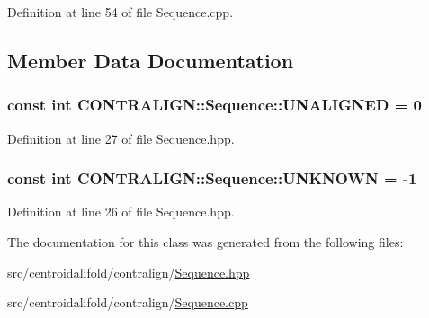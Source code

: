Definition at line 54 of file Sequence.\+cpp.



\subsection{Member Data Documentation}
\hypertarget{class_c_o_n_t_r_a_l_i_g_n_1_1_sequence_a774a2f48e7469edbb81641e5abf26ccd}{
\subsubsection[{U\+N\+A\+L\+I\+G\+N\+E\+D}]{\setlength{\rightskip}{0pt plus 5cm}const int C\+O\+N\+T\+R\+A\+L\+I\+G\+N\+::\+Sequence\+::\+U\+N\+A\+L\+I\+G\+N\+E\+D = 0\hspace{0.3cm}{\ttfamily [static]}}}\label{class_c_o_n_t_r_a_l_i_g_n_1_1_sequence_a774a2f48e7469edbb81641e5abf26ccd}


Definition at line 27 of file Sequence.\+hpp.

\hypertarget{class_c_o_n_t_r_a_l_i_g_n_1_1_sequence_a6b77aa13d532d0e59d90e82a59100755}{
\subsubsection[{U\+N\+K\+N\+O\+W\+N}]{\setlength{\rightskip}{0pt plus 5cm}const int C\+O\+N\+T\+R\+A\+L\+I\+G\+N\+::\+Sequence\+::\+U\+N\+K\+N\+O\+W\+N = -\/1\hspace{0.3cm}{\ttfamily [static]}}}\label{class_c_o_n_t_r_a_l_i_g_n_1_1_sequence_a6b77aa13d532d0e59d90e82a59100755}


Definition at line 26 of file Sequence.\+hpp.



The documentation for this class was generated from the following files\+:\begin{DoxyCompactItemize}
\item 
src/centroidalifold/contralign/\hyperlink{_sequence_8hpp}{Sequence.\+hpp}\item 
src/centroidalifold/contralign/\hyperlink{_sequence_8cpp}{Sequence.\+cpp}\end{DoxyCompactItemize}
